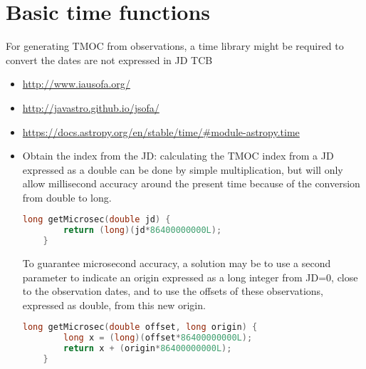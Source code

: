 \section{Basic time functions} 
For generating TMOC from observations, a time library might be required
to convert the dates are not expressed in JD TCB
\begin{itemize} 
\item \url{http://www.iausofa.org/}
\item \url{http://javastro.github.io/jsofa/}
\item \url{https://docs.astropy.org/en/stable/time/#module-astropy.time}
\item Obtain the index from the JD: calculating the TMOC index from
  a JD expressed as a double can be done by simple multiplication,
  but will only allow millisecond accuracy around the present time
  because of the conversion from double to long. 

\begin{lstlisting}[language=C]
    long getMicrosec(double jd) {
        return (long)(jd*86400000000L);
    }
\end{lstlisting}

To guarantee microsecond accuracy, a solution may be to use a second 
parameter to indicate an origin expressed as a long integer from JD=0,
close to the observation dates, and to use the offsets of these
observations, expressed as double, from this new origin.

\begin{lstlisting}[language=C]
    long getMicrosec(double offset, long origin) {
        long x = (long)(offset*86400000000L);
        return x + (origin*86400000000L);
    }     
\end{lstlisting}

\end{itemize} 
